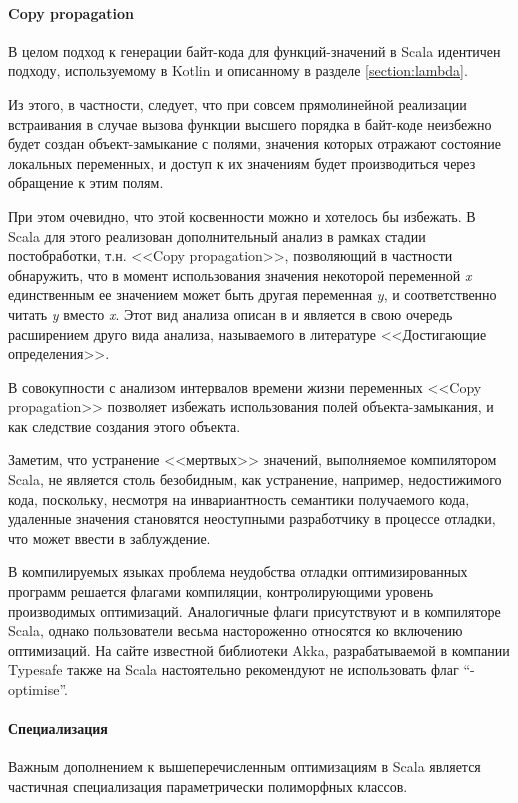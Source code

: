 \paragraph{Copy propagation}
В целом подход к генерации байт-кода для  функций-значений в Scala идентичен подходу,
используемому в Kotlin и описанному в разделе \ref{section:lambda}.

Из этого, в частности, следует, что при совсем прямолинейной реализации встраивания в случае
вызова функции высшего порядка в байт-коде неизбежно будет создан объект-замыкание с полями,
значения которых отражают состояние локальных переменных, и доступ к их значениям будет
производиться через обращение к этим полям.

При этом очевидно, что этой косвенности можно и хотелось бы избежать.
В Scala для этого реализован дополнительный анализ в рамках стадии постобработки,
т.н. <<Copy propagation>>, позволяющий в частности обнаружить, что в момент использования значения
некоторой переменной \textit{x} единственным ее значением может быть другая переменная \textit{y},
и соответственно читать \textit{y} вместо \textit{x}. Этот вид анализа описан в \cite{Muchnick}
и является в свою очередь расширением друго вида анализа, называемого в литературе
<<Достигающие определения>>.

В совокупности с анализом интервалов времени жизни переменных <<Copy propagation>> позволяет
избежать использования полей объекта-замыкания, и как следствие создания этого объекта.

Заметим, что устранение <<мертвых>> значений, выполняемое компилятором Scala, не является столь
безобидным, как устранение, например, недостижимого кода, поскольку, несмотря на инвариантность семантики
получаемого кода, удаленные значения становятся неоступными разработчику в процессе отладки,
что может ввести в заблуждение.

В компилируемых языках проблема неудобства отладки оптимизированных программ решается флагами
компиляции, контролирующими уровень производимых оптимизаций.
Аналогичные флаги присутствуют и в компиляторе Scala,
однако пользователи весьма настороженно относятся ко включению оптимизаций.
На сайте известной библиотеки Akka, разрабатываемой в компании Typesafe также на Scala настоятельно
рекомендуют не использовать флаг ``-optimise''.

\paragraph{Специализация}
Важным дополнением к вышеперечисленным оптимизациям в Scala является частичная специализация
параметрически полиморфных классов.

